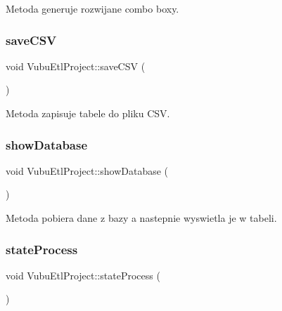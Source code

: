 Metoda generuje rozwijane combo boxy. 

\mbox{\label{class_vubu_etl_project_a05c6d827c5dadca5127626c6ed6a4ce2}} 
\subsubsection{\texorpdfstring{save\+C\+SV}{saveCSV}}
{\footnotesize\ttfamily void Vubu\+Etl\+Project\+::save\+C\+SV (\begin{DoxyParamCaption}{ }\end{DoxyParamCaption})\hspace{0.3cm}{\ttfamily [slot]}}



Metoda zapisuje tabele do pliku C\+SV. 

\mbox{\label{class_vubu_etl_project_a14c0aae91d0c6e9d0f7a4c749a6a3ea2}} 
\subsubsection{\texorpdfstring{show\+Database}{showDatabase}}
{\footnotesize\ttfamily void Vubu\+Etl\+Project\+::show\+Database (\begin{DoxyParamCaption}{ }\end{DoxyParamCaption})\hspace{0.3cm}{\ttfamily [slot]}}



Metoda pobiera dane z bazy a nastepnie wyswietla je w tabeli. 

\mbox{\label{class_vubu_etl_project_a9f69fb3747b5ecf72d5578dc3664d9ae}} 
\subsubsection{\texorpdfstring{state\+Process}{stateProcess}}
{\footnotesize\ttfamily void Vubu\+Etl\+Project\+::state\+Process (\begin{DoxyParamCaption}{ }\end{DoxyParamCaption})\hspace{0.3cm}{\ttfamily [slot]}}



